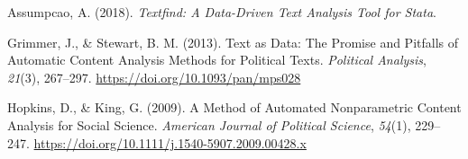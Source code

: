 \documentclass[]{article}
\theoremstyle{definition}
\theoremstyle{definition}
\theoremstyle{definition}
\theoremstyle{remark}
\begin{document}
\hypertarget{refs}{}
\leavevmode\hypertarget{ref-AssumpcaotextfindDataDrivenText2018}{}%
Assumpcao, A. (2018). \emph{Textfind: A Data-Driven Text Analysis Tool
for Stata}.

\leavevmode\hypertarget{ref-GrimmerTextDataPromise2013a}{}%
Grimmer, J., \& Stewart, B. M. (2013). Text as Data: The Promise and
Pitfalls of Automatic Content Analysis Methods for Political Texts.
\emph{Political Analysis}, \emph{21}(3), 267--297.
\url{https://doi.org/10.1093/pan/mps028}

\leavevmode\hypertarget{ref-HopkinsMethodAutomatedNonparametric2009}{}%
Hopkins, D., \& King, G. (2009). A Method of Automated Nonparametric
Content Analysis for Social Science. \emph{American Journal of Political
Science}, \emph{54}(1), 229--247.
\url{https://doi.org/10.1111/j.1540-5907.2009.00428.x}
\end{document}
